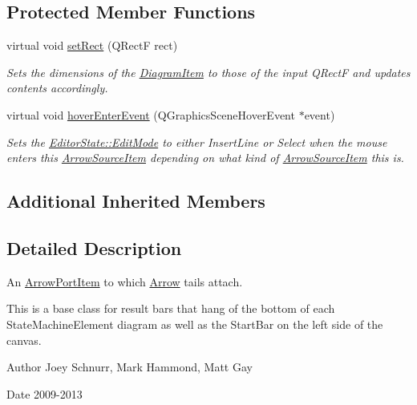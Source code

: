 \subsection*{Protected Member Functions}
\begin{DoxyCompactItemize}
\item 
\hypertarget{class_arrow_source_item_a29ed73253b4ede50058fa3ec31272737}{virtual void \hyperlink{class_arrow_source_item_a29ed73253b4ede50058fa3ec31272737}{set\-Rect} (Q\-Rect\-F rect)}\label{class_arrow_source_item_a29ed73253b4ede50058fa3ec31272737}

\begin{DoxyCompactList}\small\item\em Sets the dimensions of the \hyperlink{class_diagram_item}{Diagram\-Item} to those of the input Q\-Rect\-F and updates contents accordingly. \end{DoxyCompactList}\item 
virtual void \hyperlink{class_arrow_source_item_ac61a740c4936a783c92a1c7f13d9bb5b}{hover\-Enter\-Event} (Q\-Graphics\-Scene\-Hover\-Event $\ast$event)
\begin{DoxyCompactList}\small\item\em Sets the \hyperlink{class_editor_state_a30123e595784b2228edc2a0c2b46ab28}{Editor\-State\-::\-Edit\-Mode} to either Insert\-Line or Select when the mouse enters this \hyperlink{class_arrow_source_item}{Arrow\-Source\-Item} depending on what kind of \hyperlink{class_arrow_source_item}{Arrow\-Source\-Item} this is. \end{DoxyCompactList}\end{DoxyCompactItemize}
\subsection*{Additional Inherited Members}


\subsection{Detailed Description}
An \hyperlink{class_arrow_port_item}{Arrow\-Port\-Item} to which \hyperlink{class_arrow}{Arrow} tails attach. 

This is a base class for result bars that hang of the bottom of each State\-Machine\-Element diagram as well as the Start\-Bar on the left side of the canvas. \begin{DoxyAuthor}{Author}
Joey Schnurr, Mark Hammond, Matt Gay 
\end{DoxyAuthor}
\begin{DoxyDate}{Date}
2009-\/2013 
\end{DoxyDate}


